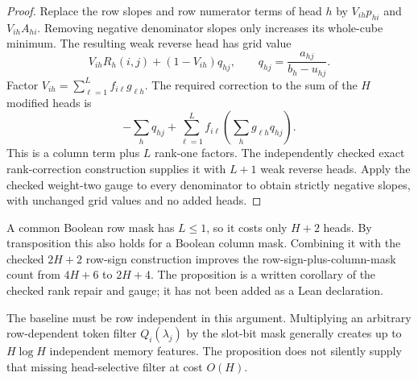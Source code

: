 \documentclass[11pt]{article}
\begin{document}
\begin{proof}
Replace the row slopes and row numerator terms of head $h$ by
$V_{ih}p_{hi}$ and $V_{ih}A_{hi}$. Removing negative denominator
slopes only increases its whole-cube minimum. The resulting weak
reverse head has grid value
\[
 V_{ih}R_h(i,j)+(1-V_{ih})q_{hj},
 \qquad q_{hj}=\frac{a_{hj}}{b_h-u_{hj}}.
\]
Factor $V_{ih}=\sum_{\ell=1}^L f_{i\ell}g_{\ell h}$.
The required correction to the sum of the $H$ modified heads is
\[
 -\sum_h q_{hj}
 +\sum_{\ell=1}^L f_{i\ell}
                  \left(\sum_hg_{\ell h}q_{hj}\right).
\]
This is a column term plus $L$ rank-one factors. The independently
checked exact rank-correction construction supplies it with $L+1$
weak reverse heads. Apply the checked weight-two gauge to every
denominator to obtain strictly negative slopes, with unchanged grid
values and no added heads.
\end{proof}

A common Boolean row mask has $L\leq1$, so it costs only $H+2$
heads. By transposition this also holds for a Boolean column mask.
Combining it with the checked $2H+2$ row-sign construction improves
the row-sign-plus-column-mask count from $4H+6$ to $2H+4$.
The proposition is a written corollary of the checked rank repair
and gauge; it has not been added as a Lean declaration.

The baseline must be row independent in this argument. Multiplying
an arbitrary row-dependent token filter $Q_i(\lambda_j)$ by the
slot-bit mask generally creates up to $H\log H$ independent memory
features. The proposition does not silently supply that missing
head-selective filter at cost $O(H)$.
\end{document}
